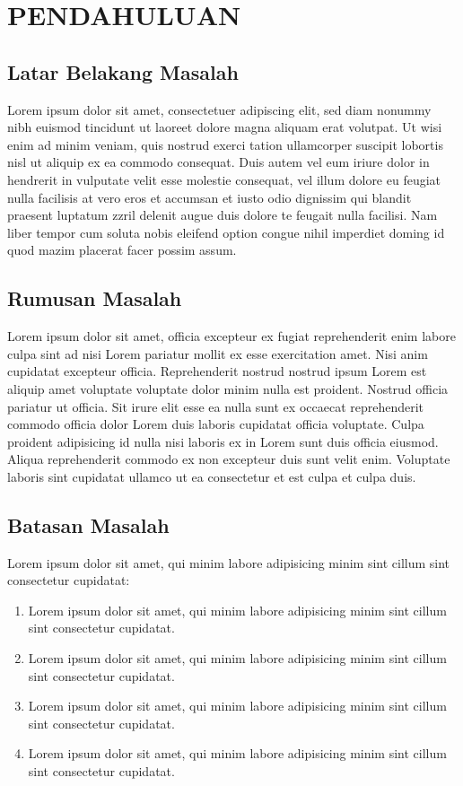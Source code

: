 
\chapter{PENDAHULUAN}

\section{Latar Belakang Masalah}
Lorem ipsum dolor sit amet, consectetuer \cite{kopka2004guide} adipiscing elit, sed diam nonummy nibh euismod tincidunt ut laoreet dolore magna aliquam erat volutpat. Ut wisi \cite{fujita1994typesetting} enim ad minim veniam, quis nostrud exerci tation ullamcorper suscipit lobortis nisl ut aliquip ex ea commodo consequat. Duis autem vel eum iriure dolor in hendrerit in vulputate velit esse molestie consequat, vel illum dolore eu feugiat nulla facilisis at vero eros et accumsan et iusto odio dignissim qui blandit praesent luptatum zzril delenit augue duis dolore te feugait nulla facilisi. Nam liber tempor cum soluta nobis eleifend option congue nihil imperdiet doming id quod mazim placerat facer possim assum.

\section{Rumusan Masalah}
Lorem ipsum dolor sit amet, officia excepteur ex fugiat reprehenderit enim labore culpa sint ad nisi Lorem pariatur mollit ex esse exercitation amet. Nisi anim cupidatat excepteur officia. Reprehenderit nostrud nostrud ipsum Lorem est aliquip amet voluptate voluptate dolor minim nulla est proident. Nostrud officia pariatur ut officia. Sit irure elit esse ea nulla sunt ex occaecat reprehenderit commodo officia dolor Lorem duis laboris cupidatat officia voluptate. Culpa proident adipisicing id nulla nisi laboris ex in Lorem sunt duis officia eiusmod. Aliqua reprehenderit commodo ex non excepteur duis sunt velit enim. Voluptate laboris sint cupidatat ullamco ut ea consectetur et est culpa et culpa duis.

\section{Batasan Masalah}
Lorem ipsum dolor sit amet, qui minim labore adipisicing minim sint cillum sint consectetur cupidatat:
\begin{enumerate}
	\item Lorem ipsum dolor sit amet, qui minim labore adipisicing minim sint cillum sint consectetur cupidatat.
	\item Lorem ipsum dolor sit amet, qui minim labore adipisicing minim sint cillum sint consectetur cupidatat.
	\item Lorem ipsum dolor sit amet, qui minim labore adipisicing minim sint cillum sint consectetur cupidatat.
	\item Lorem ipsum dolor sit amet, qui minim labore adipisicing minim sint cillum sint consectetur cupidatat.
\end{enumerate}

